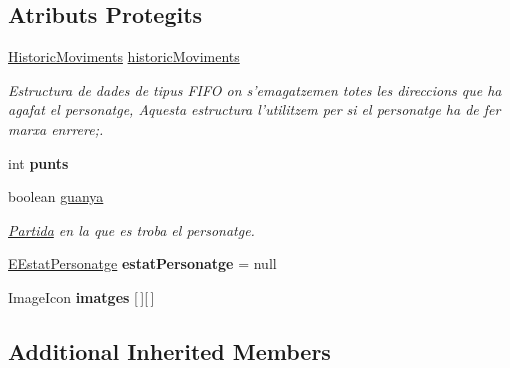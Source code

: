 \subsection*{Atributs Protegits}
\begin{DoxyCompactItemize}
\item 
\hypertarget{classlogica_1_1_personatge_a86322efbc950e2954fe2a8cde806bbd9}{\hyperlink{classlogica_1_1historic__moviments_1_1_historic_moviments}{Historic\+Moviments} \hyperlink{classlogica_1_1_personatge_a86322efbc950e2954fe2a8cde806bbd9}{historic\+Moviments}}\label{classlogica_1_1_personatge_a86322efbc950e2954fe2a8cde806bbd9}

\begin{DoxyCompactList}\small\item\em Estructura de dades de tipus F\+I\+F\+O on s'emagatzemen totes les direccions que ha agafat el personatge, Aquesta estructura l'utilitzem per si el personatge ha de fer marxa enrrere;. \end{DoxyCompactList}\item 
\hypertarget{classlogica_1_1_personatge_a2a46aceef25eeae45072cf2e6ece1506}{int {\bfseries punts}}\label{classlogica_1_1_personatge_a2a46aceef25eeae45072cf2e6ece1506}

\item 
\hypertarget{classlogica_1_1_personatge_a0c30dc6ca85f941043ae4a27e7583c67}{boolean \hyperlink{classlogica_1_1_personatge_a0c30dc6ca85f941043ae4a27e7583c67}{guanya}}\label{classlogica_1_1_personatge_a0c30dc6ca85f941043ae4a27e7583c67}

\begin{DoxyCompactList}\small\item\em \hyperlink{classlogica_1_1_partida}{Partida} en la que es troba el personatge. \end{DoxyCompactList}\item 
\hypertarget{classlogica_1_1_personatge_ac9325217d5c36660a38dd20eb240b278}{\hyperlink{enumlogica_1_1_personatge_1_1_e_estat_personatge}{E\+Estat\+Personatge} {\bfseries estat\+Personatge} = null}\label{classlogica_1_1_personatge_ac9325217d5c36660a38dd20eb240b278}

\item 
\hypertarget{classlogica_1_1_personatge_a066a8096f86141bc7a7400cca4c18a7b}{Image\+Icon {\bfseries imatges} \mbox{[}$\,$\mbox{]}\mbox{[}$\,$\mbox{]}}\label{classlogica_1_1_personatge_a066a8096f86141bc7a7400cca4c18a7b}

\end{DoxyCompactItemize}
\subsection*{Additional Inherited Members}


